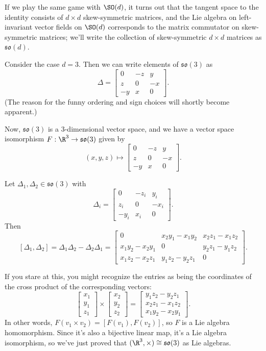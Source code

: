\begin{example}
	If we play the same game with $\SO(d)$, it turns out that the tangent space to the identity consists of $d \times d$ skew-symmetric matrices, and the Lie algebra on left-invariant vector fields on $\SO(d)$ corresponds to the matrix commutator on skew-symmetric matrices; we'll write the collection of skew-symmetric $d \times d$ matrices as $\mathfrak{so}(d)$.
	
	Consider the case $d = 3$. Then we can write elements of $\mathfrak{so}(3)$ as 
	\[
		\Delta = \begin{bmatrix} 0 & -z & y \\ z & 0 & -x \\ -y & x & 0 \end{bmatrix}.
	\]
	(The reason for the funny ordering and sign choices will shortly become apparent.)
	
	Now, $\mathfrak{so}(3)$ is a 3-dimensional vector space, and we have a vector space isomorphism $F: \R^3 \to \mathfrak{so}(3)$ given by
	\[
		(x,y,z) \mapsto \begin{bmatrix} 0 & -z & y \\ z & 0 & -x \\ -y & x & 0 \end{bmatrix}.
	\]
	
	Let $\Delta_1,\Delta_2 \in \mathfrak{so}(3)$ with 
	\[
		\Delta_i = \begin{bmatrix} 0 & -z_i & y_i \\ z_i & 0 & -x_i \\ -y_i & x_i & 0 \end{bmatrix}.
	\]
	Then
	\[
		[\Delta_1, \Delta_2] = \Delta_1 \Delta_2 - \Delta_2 \Delta_1 = \begin{bmatrix} 0 & x_2 y_1-x_1 y_2 & x_2 z_1-x_1 z_2 \\
 x_1 y_2-x_2 y_1 & 0 & y_2 z_1-y_1 z_2 \\
 x_1 z_2-x_2 z_1 & y_1 z_2-y_2 z_1 & 0 \end{bmatrix}.
	\]
	
	If you stare at this, you might recognize the entries as being the coordinates of the cross product of the corresponding vectors:
	\[
		\begin{bmatrix} x_1 \\ y_1 \\ z_1 \end{bmatrix} \times \begin{bmatrix} x_2 \\ y_2 \\ z_2 \end{bmatrix} = \begin{bmatrix} y_1 z_2-y_2 z_1 \\ x_2 z_1-x_1 z_2 \\ x_1 y_2-x_2 y_1 \end{bmatrix}.
	\]
	In other words, $F(v_1 \times v_2) = [F(v_1), F(v_2)]$, so $F$ is a Lie algebra homomorphism. Since it's also a bijective linear map, it's a Lie algebra isomorphism, so we've just proved that $(\R^3, \times) \cong \mathfrak{so}(3)$ as Lie algebras.
	

\end{example}

